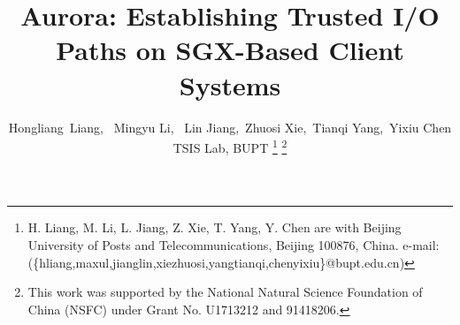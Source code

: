\documentclass[journal,twocolumn,letterpaper,10pt]{ieee-sty/IEEEtran}
\begin{document}


\title{Aurora: Establishing Trusted I/O Paths on SGX-Based Client Systems}

\author{Hongliang~Liang,~
	Mingyu Li,%
	~Lin Jiang,~Zhuosi Xie,~Tianqi Yang,~Yixiu Chen\\
	TSIS Lab, BUPT
	\thanks{H. Liang, M. Li, L. Jiang, Z. Xie, T. Yang, Y. Chen 
  are with Beijing University of Posts and Telecommunications, Beijing 100876, China. e-mail: (\{hliang,maxul,jianglin,xiezhuosi,yangtianqi,chenyixiu\}@bupt.edu.cn)
  }%
	\thanks{This work was supported by the National Natural Science Foundation of China (NSFC) under Grant No. U1713212 and 91418206.}
}

\maketitle









\end{document}
